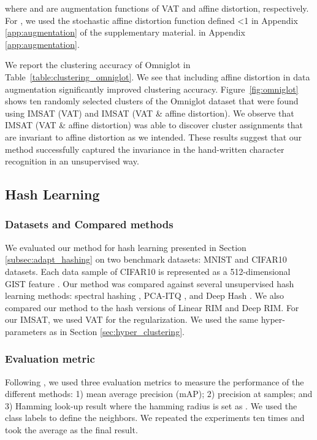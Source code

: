 \documentclass{article}
\theoremstyle{plain}
\newcounter{long}
\begin{document}
where  and  are augmentation functions of VAT and affine distortion, respectively. For , we used the stochastic affine distortion function defined 
\ifnum\value{long}<1
in Appendix \ref{app:augmentation} of the supplementary material.
\else
in Appendix \ref{app:augmentation}. 
\fi

We report the clustering accuracy of Omniglot in Table~\ref{table:clustering_omniglot}. 
We see that including affine distortion in data augmentation significantly improved clustering accuracy.
Figure~\ref{fig:omniglot} shows ten randomly selected clusters of the Omniglot dataset that were found using IMSAT (VAT) and IMSAT (VAT \& affine distortion).
We observe that IMSAT (VAT \& affine distortion) was able to discover cluster assignments that are invariant to affine distortion as we intended. 
These results suggest that our method successfully captured the invariance in the hand-written character recognition in an unsupervised way.







\subsection{Hash Learning} \label{subsec:hashing}


\subsubsection{Datasets and Compared methods}
We evaluated our method for hash learning presented in Section \ref{subsec:adapt_hashing} on two benchmark datasets: MNIST and CIFAR10 datasets. Each data sample of CIFAR10 is represented as a 512-dimensional GIST feature \citep{oliva2001modeling}. 
Our method was compared against several unsupervised hash learning methods: spectral hashing \citep{weiss2009spectral}, PCA-ITQ \citep{gong2013iterative}, and Deep Hash \citep{erin2015deep}. 
We also compared our method to the hash versions of Linear RIM and Deep RIM. 
For our IMSAT, we used VAT for the regularization.
We used the same hyper-parameters as in Section \ref{sec:hyper_clustering}. 

\subsubsection{Evaluation metric}
Following \citet{erin2015deep}, we used three evaluation metrics to measure the performance of the different methods: 1) mean average precision (mAP); 2) precision at  samples; and 3) Hamming look-up result where the hamming radius is set as . We used the class labels to define the neighbors.
We repeated the experiments ten times and took the average as the final result. 
\end{document}
